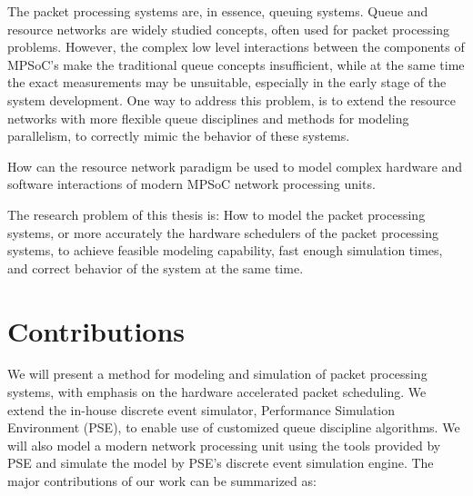 
The packet processing systems are, in essence, queuing systems. Queue and resource networks are widely studied concepts, often used for packet processing problems. However, the complex low level interactions between the components of MPSoC's make the traditional queue concepts insufficient, while at the same time the exact measurements may be unsuitable, especially in the early stage of the system development. One way to address this problem, is to extend the resource networks with more flexible queue disciplines and methods for modeling parallelism, to correctly mimic the behavior of these systems.


How can the resource network paradigm be used to model complex hardware and software interactions of modern MPSoC network processing units.

The research problem of this thesis is: How to model the packet processing systems, or more accurately the hardware schedulers of the packet processing systems, to achieve feasible modeling capability, fast enough simulation times, and correct behavior of the system at the same time.

\section{Contributions}
We will present a method for modeling and simulation of packet processing systems, with emphasis on the hardware accelerated packet scheduling. We extend the in-house discrete event simulator, Performance Simulation Environment (PSE), to enable use of customized queue discipline algorithms. We will also model a modern network processing unit using the tools provided by PSE and simulate the model by PSE's discrete event simulation engine. The major contributions of our work can be summarized as:



